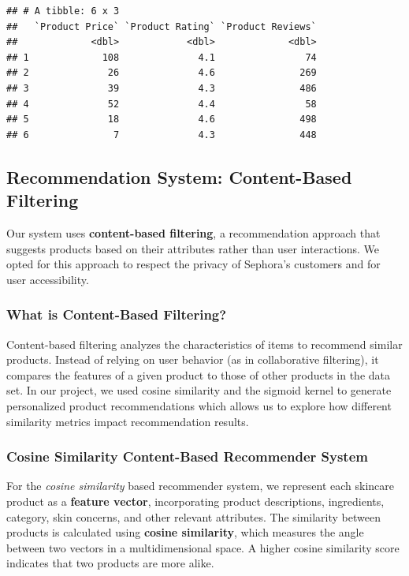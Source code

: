 \documentclass[
]{article}
\begin{document}
\begin{verbatim}
## # A tibble: 6 x 3
##   `Product Price` `Product Rating` `Product Reviews`
##             <dbl>            <dbl>             <dbl>
## 1             108              4.1                74
## 2              26              4.6               269
## 3              39              4.3               486
## 4              52              4.4                58
## 5              18              4.6               498
## 6               7              4.3               448
\end{verbatim}

\subsection{Recommendation System: Content-Based
Filtering}\label{recommendation-system-content-based-filtering}

Our system uses \textbf{content-based filtering}, a recommendation
approach that suggests products based on their attributes rather than
user interactions. We opted for this approach to respect the privacy of
Sephora's customers and for user accessibility.

\subsubsection{\texorpdfstring{\textbf{What is Content-Based
Filtering?}}{What is Content-Based Filtering?}}\label{what-is-content-based-filtering}

Content-based filtering analyzes the characteristics of items to
recommend similar products. Instead of relying on user behavior (as in
collaborative filtering), it compares the features of a given product to
those of other products in the data set. In our project, we used cosine
similarity and the sigmoid kernel to generate personalized product
recommendations which allows us to explore how different similarity
metrics impact recommendation results.

\subsubsection{Cosine Similarity Content-Based Recommender
System}\label{cosine-similarity-content-based-recommender-system}

For the \emph{cosine similarity} based recommender system, we represent
each skincare product as a \textbf{feature vector}, incorporating
product descriptions, ingredients, category, skin concerns, and other
relevant attributes. The similarity between products is calculated using
\textbf{cosine similarity}, which measures the angle between two vectors
in a multidimensional space. A higher cosine similarity score indicates
that two products are more alike.
\end{document}
